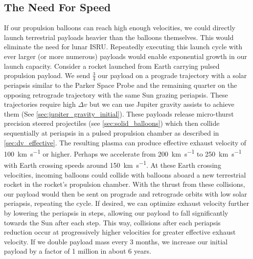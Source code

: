 \documentclass{article}
\begin{document}
{\subsection{The Need For Speed}\label{sec:no_isru_rocket}
If our propulsion balloons can reach high enough velocities, we could directly launch terrestrial payloads heavier than the balloons themselves.   This would eliminate the need for lunar ISRU. Repeatedly executing this launch cycle with ever larger (or more numerous) payloads would enable exponential growth in our launch capacity. Consider a rocket launched from Earth carrying pulsed propulsion payload.   We send $\frac{3}{4}$ our payload on a prograde trajectory with a solar periapsis similar to the Parker Space Probe and the remaining quarter on the opposing retrograde trajectory with the same Sun grazing periapsis.  These trajectories require high $\Delta v$ but we can use Jupiter gravity assists to achieve them (See \autoref{sec:jupiter_gravity_initial}).   These payloads release micro-thurst precision steered projectiles (see \autoref{sec:solid_balloons}) which then collide sequentially at periapsis in a pulsed propulsion chamber as described in \autoref{sec:dv_effective}. The resulting plasma can produce effective exhaust velocity of \SI{100}{\kilo\meter\per\second} or higher. Perhaps we accelerate from \SI{200}{\kilo\meter\per\second} to \SI{250}{\kilo\meter\per\second} with Earth crossing speeds around \SI{150}{\kilo\meter\per\second}.  At these Earth crossing velocities, incoming balloons could collide with balloons aboard a new terrestrial rocket in the rocket's propulsion chamber.  With the thrust from these collisions, our payload would then be sent on prograde and retrograde orbits with low solar periapsis, repeating the cycle.  If desired, we can optimize exhaust velocity further by lowering the periapsis in steps, allowing our payload to fall significantly towards the Sun after each step.  This way, collisions after each periapsis reduction occur at progressively higher velocities for greater effective exhaust velocity.   If we double payload mass every 3 months, we increase our initial payload by a factor of 1 million in about 6 years. 

}
\end{document}
